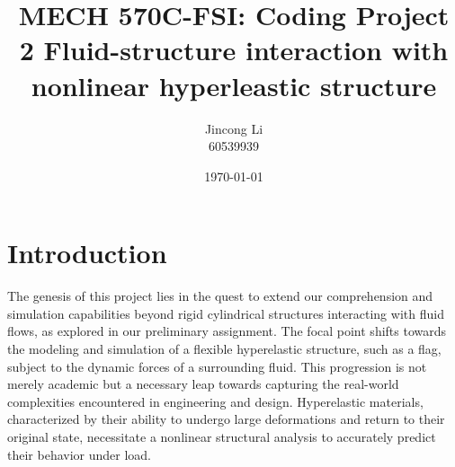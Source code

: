\documentclass[a4paper,12pt]{article} %
\begin{document}
\setlength{\parskip}{1em} 
\setlength{\parindent}{0pt}
\newcommand{\vect}[1]{\mathbf{#1}}

\title{MECH 570C-FSI: Coding Project 2
Fluid-structure interaction with nonlinear hyperleastic structure}
\author{Jincong Li \\ 60539939}
\date{\today}
\maketitle


\section*{Introduction}
The genesis of this project lies in the quest to extend our comprehension and simulation 
capabilities beyond rigid cylindrical structures interacting with fluid flows, 
as explored in our preliminary assignment. The focal point shifts towards the 
modeling and simulation of a flexible hyperelastic structure, such as a flag, 
subject to the dynamic forces of a surrounding fluid. This progression is not 
merely academic but a necessary leap towards capturing the real-world complexities 
encountered in engineering and design. Hyperelastic materials, characterized by 
their ability to undergo large deformations and return to their original state, 
necessitate a nonlinear structural analysis to accurately predict their behavior under load.
\end{document}
